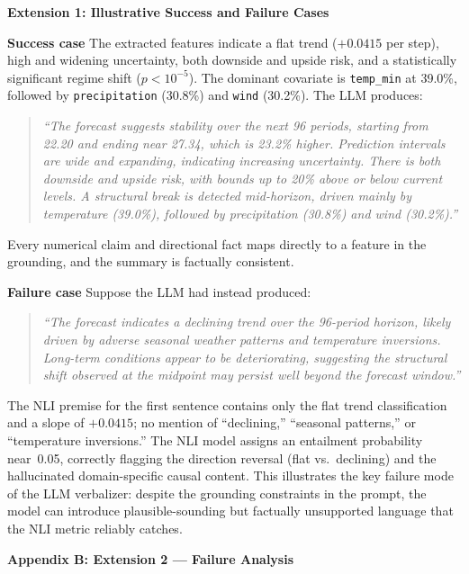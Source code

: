 \documentclass[conference]{IEEEtran}
\begin{document}
\appendix

\textbf{Extension 1: Illustrative Success and Failure Cases}

\textbf{Success case}
The extracted features indicate a flat trend ($+0.0415$ per step), high and widening uncertainty, both downside and upside risk, and a statistically significant regime shift ($p < 10^{-5}$). The dominant covariate is \texttt{temp\_min} at 39.0\%, followed by \texttt{precipitation} (30.8\%) and \texttt{wind} (30.2\%).
The LLM produces:
\begin{quote}
\emph{``The forecast suggests stability over the next 96 periods, starting from 22.20 and ending near 27.34, which is 23.2\% higher. Prediction intervals are wide and expanding, indicating increasing uncertainty. There is both downside and upside risk, with bounds up to 20\% above or below current levels. A structural break is detected mid-horizon, driven mainly by temperature (39.0\%), followed by precipitation (30.8\%) and wind (30.2\%).''}
\end{quote}
Every numerical claim and directional fact maps directly to a feature in the grounding, and the summary is factually consistent.

\textbf{Failure case}
Suppose the LLM had instead produced:
\begin{quote}
\emph{``The forecast indicates a declining trend over the 96-period horizon, likely driven by adverse seasonal weather patterns and temperature inversions. Long-term conditions appear to be deteriorating, suggesting the structural shift observed at the midpoint may persist well beyond the forecast window.''}
\end{quote}
The NLI premise for the first sentence contains only the flat trend classification and a slope of $+0.0415$; no mention of ``declining,'' ``seasonal patterns,'' or ``temperature inversions.''
The NLI model assigns an entailment probability near~0.05, correctly flagging the direction reversal (flat vs.\ declining) and the hallucinated domain-specific causal content.
This illustrates the key failure mode of the LLM verbalizer: despite the grounding constraints in the prompt, the model can introduce plausible-sounding but factually unsupported language that the NLI metric reliably catches.


\vspace{4mm}
\textbf{Appendix B: Extension 2 — Failure Analysis}
\end{document}

